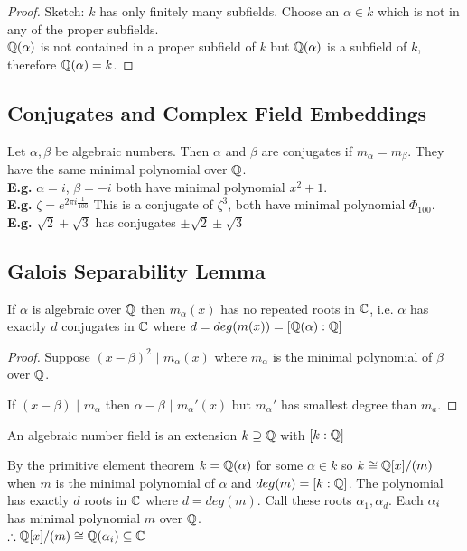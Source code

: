 \documentclass[11pt]{article}
\begin{document}
\begin{proof}
	Sketch: $k$ has only finitely many subfields.
	Choose an $\alpha \in k$ which is not in any of the proper subfields.
	$ $\\
	
	$\mathbb{Q} (\alpha)$ is not contained in a proper subfield of $k$ but $\mathbb{Q}(\alpha)$ is a subfield of $k$, therefore $\mathbb{Q}(\alpha) = k$.
\end{proof}

\subsection{Conjugates and Complex Field Embeddings}

Let $\alpha, \beta $ be algebraic numbers.
Then $\alpha$ and $\beta$ are conjugates if $m_\alpha = m_\beta$. They have the same minimal polynomial over $\mathbb{Q}$.
$ $\\[1em]
\textbf{E.g.} $\alpha = i$, $\beta = -i$ both have minimal polynomial $x^2 + 1$.\\
\textbf{E.g.} $\zeta = e^{2 \pi i \frac{1}{100}} $ This is a conjugate of $\zeta^3$, both have minimal polynomial $\Phi_{100}$.\\
\textbf{E.g.} $\sqrt{2} + \sqrt{3}$ has conjugates $\pm \sqrt{2} \pm \sqrt{3}$


\subsection{Galois Separability Lemma}
\begin{lemma}
	If $\alpha$ is algebraic over $\mathbb{Q}$ then $m_{\alpha}(x)$ has no repeated roots in $\mathbb{C}$, i.e. $\alpha$ has exactly $d$ conjugates in $\mathbb{C}$ where $d = deg(m(x)) = [\mathbb{Q}(\alpha) : \mathbb{Q}]$
\end{lemma}


\begin{proof}
	Suppose $(x-\beta)^2$ $|$ $ m_\alpha(x) $ where $m_\alpha$ is the minimal polynomial of $\beta$ over $\mathbb{Q}$.

	If $(x-\beta)$ $ | $ $ m_\alpha$ then $\alpha - \beta $ $ | $ $ m_\alpha '(x) $ but $m_\alpha'$ has smallest degree than $m_a$. \lightning


\end{proof}

\begin{defn}
	An algebraic number field is an extension $k \supseteq \mathbb{Q}$ with $[k: \mathbb{Q}]$
\end{defn}
$ $\\[-0.5em]
By the primitive element theorem $k = \mathbb{Q} (\alpha)$ for some $\alpha \in k$ so $k \cong \mathbb{Q}[x] /(m) $ when $m$ is the minimal polynomial of $\alpha$ and $ deg(m) = [k: \mathbb{Q}]$.
The polynomial has exactly $d$ roots in $\mathbb{C}$ where $d= deg(m)$. 
Call these roots $\alpha_1, \alpha_d$. 
Each $\alpha_i$ has minimal polynomial $m$ over $\mathbb{Q}$.
$ $\\[1em]
$\therefore \mathbb{Q}[x] /(m) \cong \mathbb{Q}(\alpha_i) \subseteq \mathbb{C}$
$ $\\[-0.5em]
\end{document}
